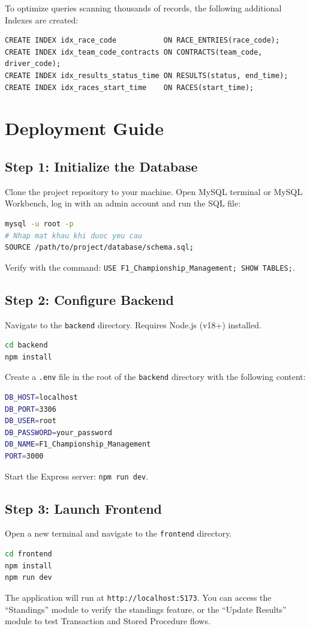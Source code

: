 \documentclass[12pt, a4paper]{report}
\begin{document}
To optimize queries scanning thousands of records, the following additional Indexes are created:
\begin{lstlisting}[caption={Performance optimization with Indexes}]
CREATE INDEX idx_race_code           ON RACE_ENTRIES(race_code);
CREATE INDEX idx_team_code_contracts ON CONTRACTS(team_code, driver_code);
CREATE INDEX idx_results_status_time ON RESULTS(status, end_time);
CREATE INDEX idx_races_start_time    ON RACES(start_time);
\end{lstlisting}

\section{Deployment Guide}

\subsection{Step 1: Initialize the Database}
Clone the project repository to your machine. Open MySQL terminal or MySQL Workbench, log in with an admin account and run the SQL file:
\begin{lstlisting}[language=bash]
mysql -u root -p
# Nhap mat khau khi duoc yeu cau
SOURCE /path/to/project/database/schema.sql;
\end{lstlisting}
Verify with the command: \texttt{USE F1\_Championship\_Management; SHOW TABLES;}.

\subsection{Step 2: Configure Backend}
Navigate to the \texttt{backend} directory. Requires Node.js (v18+) installed.
\begin{lstlisting}[language=bash]
cd backend
npm install
\end{lstlisting}
Create a \texttt{.env} file in the root of the \texttt{backend} directory with the following content:
\begin{lstlisting}[language=bash]
DB_HOST=localhost
DB_PORT=3306
DB_USER=root
DB_PASSWORD=your_password
DB_NAME=F1_Championship_Management
PORT=3000
\end{lstlisting}
Start the Express server: \texttt{npm run dev}.

\subsection{Step 3: Launch Frontend}
Open a new terminal and navigate to the \texttt{frontend} directory.
\begin{lstlisting}[language=bash]
cd frontend
npm install
npm run dev
\end{lstlisting}
The application will run at \texttt{http://localhost:5173}. You can access the ``Standings'' module to verify the standings feature, or the ``Update Results'' module to test Transaction and Stored Procedure flows.
\end{document}
